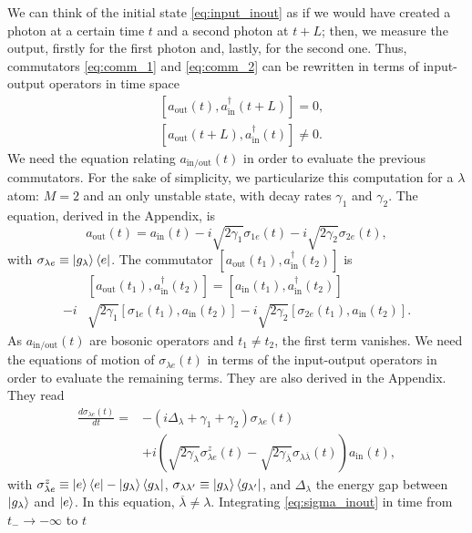 \documentclass[notitlepage, prx, preprint, amsmath,superscriptaddress,amssymb]{revtex4-1}
\begin{document}
We can think of the initial state \eqref{eq:input_inout} as if we would have created a photon at a certain time $t$ and a second photon at $t+L$; then, we measure the output, firstly for the first photon and, lastly, for the second one. Thus, commutators \eqref{eq:comm_1} and \eqref{eq:comm_2} can be rewritten in terms of input-output operators in time space \cite{Fan2010}
\begin{align}
\label{eq:comm_a_1}&[a_\text{out}(t),a_\text{in}^\dagger(t+L)]=0,\\
\label{eq:comm_a_2}&[a_\text{out}(t+L),a_\text{in}^\dagger(t)]\neq 0.
\end{align}
We need the equation relating $a_\text{in/out}(t)$ in order to evaluate the previous commutators. For the sake of simplicity, we particularize this computation for a $\lambda$ atom: $M=2$ and an only unstable state, with decay rates $\gamma_1$ and $\gamma_2$. The equation, derived in the Appendix, is
\begin{equation}
\label{eq:a_inout}a_\text{out}(t)=a_\text{in}(t) - i\sqrt{2\gamma_1}\sigma_{1e}(t)-i\sqrt{2\gamma_2}\sigma_{2e}(t),
\end{equation}
with $\sigma_{\lambda e}\equiv \ket{g_\lambda}\bra{e}$. The commutator $[a_\text{out}(t_1),a_\text{in}^\dagger(t_2)]$ is
\begin{align}\label{eq:comm_in_out}
&[a_\text{out}(t_1),a_\text{in}^\dagger(t_2)]=[a_\text{in}(t_1),a_\text{in}^\dagger(t_2)]\nonumber\\
-i&\sqrt{2\gamma_1}[\sigma_{1e}(t_1),a_\text{in}(t_2)]-i\sqrt{2\gamma_2}[\sigma_{2e}(t_1),a_\text{in}(t_2)].
\end{align}
As $a_\text{in/out}(t)$ are bosonic operators \cite{Fan2010} and $t_1\neq t_2$, the first term vanishes. We need the equations of motion of $\sigma_{\lambda e}(t)$ in terms of the input-output operators in order to evaluate the remaining terms. They are also derived in the Appendix. They read
\begin{align}
\label{eq:sigma_inout}\frac{d\sigma_{\lambda e}(t)}{dt}=&-(i\Delta_\lambda+\gamma_1+\gamma_2)\sigma_{\lambda e}(t)\nonumber\\
&+i\left(\sqrt{2\gamma_\lambda}\sigma_{\lambda e}^z(t)-\sqrt{2\gamma_{\overline{\lambda}}}\sigma_{\lambda \overline{\lambda}}(t)\right)a_\text{in}(t),
\end{align}
with $\sigma_{\lambda e}^z\equiv \ket{e}\bra{e}-\ket{g_\lambda}\bra{g_\lambda}$, $\sigma_{\lambda\lambda'}\equiv \ket{g_\lambda}\bra{g_{\lambda'}}$, and $\Delta_\lambda$ the energy gap between $\ket{g_\lambda}$ and $\ket{e}$. In this equation, $\overline{\lambda}\neq \lambda$. Integrating \eqref{eq:sigma_inout} in time from $t_-\to-\infty$ to $t$
\end{document}
